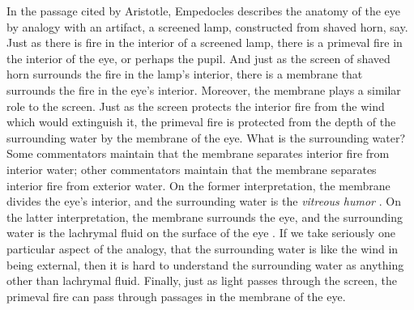 In the passage cited by Aristotle, Empedocles describes the anatomy of the eye by analogy with an artifact, a screened lamp, constructed from shaved horn, say. Just as there is fire in the interior of a screened lamp, there is a primeval fire in the interior of the eye, or perhaps the pupil. And just as the screen of shaved horn surrounds the fire in the lamp's interior, there is a membrane that surrounds the fire in the eye's interior. Moreover, the membrane plays a similar role to the screen. Just as the screen protects the interior fire from the wind which would extinguish it, the primeval fire is protected from the depth of the surrounding water by the membrane of the eye. What is the surrounding water? Some commentators maintain that the membrane separates interior fire from interior water; other commentators maintain that the membrane separates interior fire from exterior water. On the former interpretation, the membrane divides the eye's interior, and the surrounding water is the \emph{vitreous humor} \citep[16]{Beare:1906uq}. On the latter interpretation, the membrane surrounds the eye, and the surrounding water is the lachrymal fluid on the surface of the eye \citep{Sedley:1992uq}. If we take seriously one particular aspect of the analogy, that the surrounding water is like the wind in being external, then it is hard to understand the surrounding water as anything other than lachrymal fluid. Finally, just as light passes through the screen, the primeval fire can pass through passages in the membrane of the eye.

